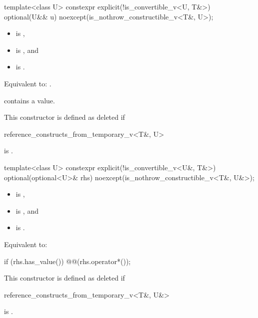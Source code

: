 %
\begin{itemdecl}
template<class U>
  constexpr explicit(!is_convertible_v<U, T&>) optional(U&& u) noexcept(is_nothrow_constructible_v<T&, U>);
\end{itemdecl}

\begin{itemdescr}
\pnum
\constraints
\begin{itemize}
\item {} is ,
\item {} is , and
\item {} is .
\end{itemize}

\pnum
\effects
Equivalent to: .

\pnum
\ensures
{} contains a value.

\pnum
\remarks
This constructor is defined as deleted if
\begin{codeblock}
reference_constructs_from_temporary_v<T&, U>
\end{codeblock}
is .
\end{itemdescr}

%
\begin{itemdecl}
template<class U>
  constexpr explicit(!is_convertible_v<U&, T&>) optional(optional<U>& rhs) noexcept(is_nothrow_constructible_v<T&, U&>);
\end{itemdecl}

\begin{itemdescr}
\pnum
\constraints
\begin{itemize}
\item {} is ,
\item {} is , and
\item {} is .
\end{itemize}

\pnum
\effects
Equivalent to:
\begin{codeblock}
if (rhs.has_value()) @@(rhs.operator*());
\end{codeblock}

\pnum
\remarks
This constructor is defined as deleted if
\begin{codeblock}
reference_constructs_from_temporary_v<T&, U&>
\end{codeblock}
is .
\end{itemdescr}


